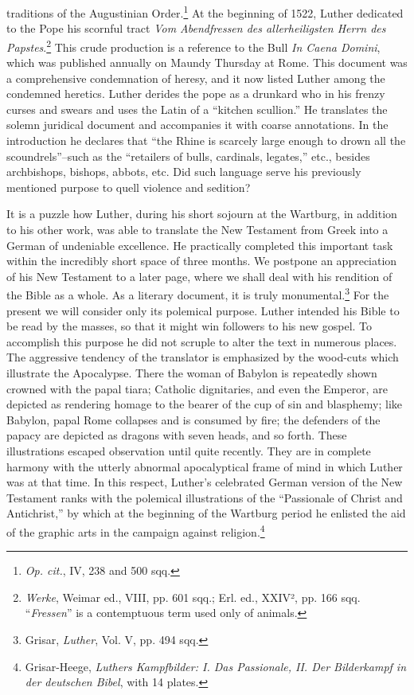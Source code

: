 traditions of the Augustinian Order.\footnote{\textit{Op. cit.}, IV, 238 and 500 sqq.}
At the beginning of 1522, Luther dedicated to the Pope his scornful tract
\textit{Vom Abendfressen des allerheiligsten Herrn des Papstes}.\footnote
{\textit{Werke}, Weimar ed., VIII, pp. 601 sqq.; Erl. ed., XXIV², pp. 166 sqq. “\textit{Fressen}” is a
contemptuous term used only of animals.}
This crude production is a reference to the Bull \textit{In Caena Domini},
which was published annually on Maundy Thursday at Rome. This
document was a comprehensive condemnation of heresy, and it now
listed Luther among the condemned heretics. Luther derides the
pope as a drunkard who in his frenzy curses and swears and uses the
Latin of a “kitchen scullion.” He translates the solemn juridical document
and accompanies it with coarse annotations. In the introduction
he declares that “the Rhine is scarcely large enough to drown all
the scoundrels”--such as the “retailers of bulls, cardinals, legates,”
etc., besides archbishops, bishops, abbots, etc. Did such language serve
his previously mentioned purpose to quell violence and sedition?

It is a puzzle how Luther, during his short sojourn at the Wartburg, in
addition to his other work, was able to translate the New
Testament from Greek into a German of undeniable excellence. He
practically completed this important task within the incredibly short
space of three months. We postpone an appreciation of his New Testament
to a later page, where we shall deal with his rendition of the
Bible as a whole. As a literary document, it is truly monumental.\footnote{Grisar, \textit{Luther}, Vol. V, pp. 494 sqq.}
For the present we will consider only its polemical purpose. Luther
intended his Bible to be read by the masses, so that it might win followers
to his new gospel. To accomplish this purpose he did not
scruple to alter the text in numerous places. The aggressive tendency
of the translator is emphasized by the wood-cuts which illustrate
the Apocalypse. There the woman of Babylon is repeatedly shown
crowned with the papal tiara; Catholic dignitaries, and even the Emperor,
are depicted as rendering homage to the bearer of the cup of
sin and blasphemy; like Babylon, papal Rome collapses and is consumed by
fire; the defenders of the papacy are depicted as dragons with
seven heads, and so forth. These illustrations escaped observation until
quite recently. They are in complete harmony with the utterly abnormal
apocalyptical frame of mind in which Luther was at that
time. In this respect, Luther’s celebrated German version of the New
Testament ranks with the polemical illustrations of the “Passionale
of Christ and Antichrist,” by which at the beginning of the Wartburg period
he enlisted the aid of the graphic arts in the campaign
against religion.\footnote
{Grisar-Heege, \textit{Luthers Kampfbilder: I. Das Passionale, II. Der Bilderkampf in der
deutschen Bibel}, with 14 plates.}

